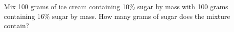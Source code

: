 Mix 100 grams of ice cream containing 10\% sugar by mass with 100 grams containing 16\% sugar by mass. How many grams of sugar does the mixture contain?
